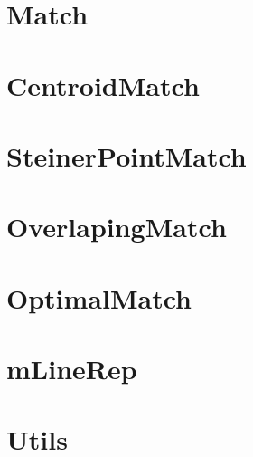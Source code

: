 \begin{landscape}
\begin{tiny}
\section{Match}


\section{CentroidMatch}


\section{SteinerPointMatch}


\section{OverlapingMatch}


\section{OptimalMatch}


\section{mLineRep}


\section{Utils}


\end{tiny}
\end{landscape}